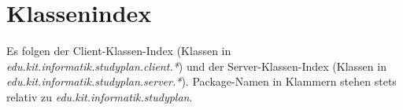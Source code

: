 \section{Klassenindex}

Es folgen der Client-Klassen-Index (Klassen in \textit{edu.kit.informatik.studyplan.client.*}) und der Server-Klassen-Index (Klassen in\textit{ edu.kit.informatik.studyplan.server.*}). Package-Namen in Klammern stehen stets relativ zu \textit{edu.kit.informatik.studyplan}.


